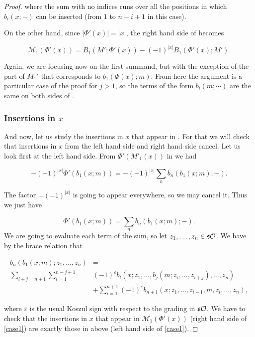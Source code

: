 \documentclass[Thesis.tex]{subfiles}
\begin{document}
\begin{proof}
where the sum with no indices runs over all the positions in which $b_i(x;-)$ can be inserted (from $1$ to $n-i+1$ in this case). 

On the other hand, since $|\Phi'(x)|=|x|$, the right hand side of  becomes

\begin{equation}\label{mphi}
\mathcal{M}_1(\Phi'(x))=B_1(M';\Phi'(x))-(-1)^{|x|}B_1(\Phi'(x);M').
\end{equation}

Again, we are focusing now on the first summand, but with the exception of the part of $M_1'$ that corresponds to $b_1(\Phi(x);m)$. From here the argument is a particular case of the proof for $j>1$, so the terms of the form $b_l(m;\cdots)$ are the same on both sides of . 


\subsubsection*{Insertions in $x$}

And now, let us study the insertions in $x$ that appear in . For that we will check that insertions in $x$ from the left hand side and right hand side cancel. Let us look first at the left hand side. From $\Phi'(M'_1(x))$ in  we had 

\[-(-1)^{|x|}\Phi'(b_1(x;m))=-(-1)^{|x|}\sum_n b_n(b_1(x;m);-).\]

The factor $-(-1)^{|x|}$ is going to appear everywhere, so we may cancel it. Thus we just have

\[\Phi'(b_1(x;m))=\sum_n b_n(b_1(x;m);-).\]
We are going to evaluate each term of the sum, so let $z_1,\dots, z_n\in \mathfrak{s}{\mathcal O}$. We have by the brace relation that

\begin{align}\label{insertionx1}
b_n(b_1(x;m);z_1,\dots, z_n)&=\\
 \sum_{l+j=n+1}\sum_{i=1}^{n-j+1}&(-1)^{\varepsilon} b_l(x;z_1,\dots,b_j(m;z_{i},\dots, z_{i+j}),\dots, z_n)\nonumber\\
 &+\sum_{i=1}^{n+1}(-1)^{\varepsilon}b_{n+1}(x;z_1,\dots, z_{i-1},m,z_i,\dots, z_n),\nonumber
\end{align}

where $\varepsilon$ is the usual Koszul sign with respect to the grading in $\mathfrak{s}{\mathcal O}$. We have to check that the insertions in $x$ that appear in $\mathcal{M}_1(\Phi'(x))$ (right hand side of \cref{case1}) are exactly those in  above (left hand side of \cref{case1}).


\end{proof}
\end{document}
